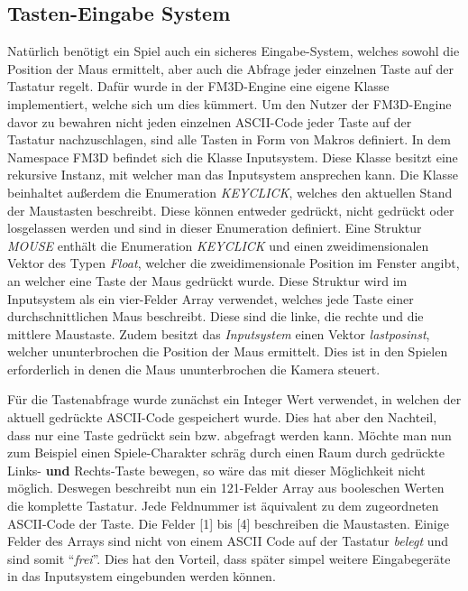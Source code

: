 \subsection{Tasten-Eingabe System}
Natürlich benötigt ein Spiel auch ein sicheres Eingabe-System, welches sowohl die Position der Maus ermittelt, aber auch die Abfrage jeder einzelnen Taste auf der Tastatur regelt. 
Dafür wurde in der FM3D-Engine eine eigene Klasse implementiert, welche sich um dies kümmert.
Um den Nutzer der FM3D-Engine davor zu bewahren nicht jeden einzelnen ASCII-Code jeder Taste auf der Tastatur nachzuschlagen, sind alle Tasten in Form von Makros definiert. 
In dem Namespace FM3D befindet sich die Klasse Inputsystem. Diese Klasse besitzt eine rekursive Instanz, mit welcher man das Inputsystem ansprechen kann. 
Die Klasse beinhaltet außerdem die Enumeration \textit{KEYCLICK}, welches den aktuellen Stand der Maustasten beschreibt. Diese können entweder gedrückt, nicht gedrückt oder losgelassen werden und sind in dieser Enumeration definiert.
Eine Struktur \textit{MOUSE} enthält die Enumeration \textit{KEYCLICK} und einen zweidimensionalen Vektor des Typen \textit{Float}, welcher die zweidimensionale Position im Fenster angibt, an welcher eine Taste der Maus gedrückt wurde.
Diese Struktur wird im Inputsystem als ein vier-Felder Array verwendet, welches jede Taste einer durchschnittlichen Maus beschreibt. Diese sind die linke, die rechte und die mittlere Maustaste. 
Zudem besitzt das \textit{Inputsystem} einen Vektor \textit{lastposinst}, welcher ununterbrochen die Position der Maus ermittelt. Dies ist in den Spielen erforderlich in denen die Maus ununterbrochen die Kamera steuert.

Für die Tastenabfrage wurde zunächst ein Integer Wert verwendet, in welchen der aktuell gedrückte ASCII-Code gespeichert wurde. Dies hat aber den Nachteil, dass nur eine Taste gedrückt sein bzw. abgefragt werden kann. Möchte man nun zum Beispiel einen Spiele-Charakter schräg durch einen Raum durch gedrückte Links- \textbf{und} Rechts-Taste bewegen, so wäre das mit dieser Möglichkeit nicht möglich. Deswegen beschreibt nun ein 121-Felder Array aus booleschen Werten die komplette Tastatur. Jede Feldnummer ist äquivalent zu dem zugeordneten ASCII-Code der Taste. Die Felder [1] bis [4] beschreiben die Maustasten. Einige Felder des Arrays sind nicht von einem ASCII Code auf der Tastatur \textit{belegt} und sind somit "`\textit{frei}"'. Dies hat den Vorteil, dass später simpel weitere Eingabegeräte in das Inputsystem eingebunden werden können.

